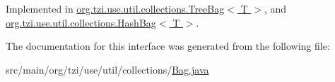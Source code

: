 Implemented in \hyperlink{classorg_1_1tzi_1_1use_1_1util_1_1collections_1_1_tree_bag_3_01_t_01_4_ad5cf4d5b2e374f914ab12850466bc736}{org.\-tzi.\-use.\-util.\-collections.\-Tree\-Bag$<$ T $>$}, and \hyperlink{classorg_1_1tzi_1_1use_1_1util_1_1collections_1_1_hash_bag_3_01_t_01_4_a9ca7e3a3af945b882daefb70f2e1126f}{org.\-tzi.\-use.\-util.\-collections.\-Hash\-Bag$<$ T $>$}.



The documentation for this interface was generated from the following file\-:\begin{DoxyCompactItemize}
\item 
src/main/org/tzi/use/util/collections/\hyperlink{_bag_8java}{Bag.\-java}\end{DoxyCompactItemize}
